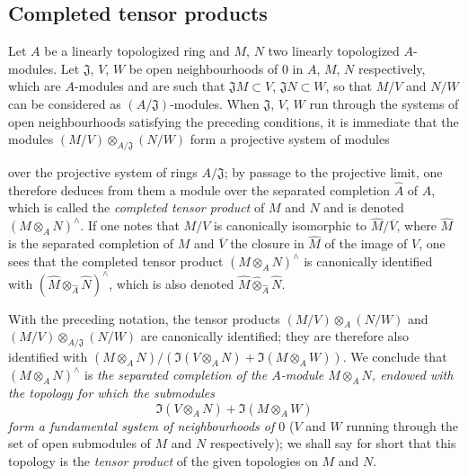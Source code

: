 \subsection{Completed tensor products}
\label{subsection:0.7.7}

\begin{env}[7.7.1]
\label{0.7.7.1}
Let $A$ be a linearly topologized ring and $M$, $N$ two linearly
topologized $A$-modules. Let $\mathfrak J$, $V$, $W$ be open neighbourhoods
of $0$ in $A$, $M$, $N$ respectively, which are
$A$-modules and are such that $\mathfrak JM\subset V$, $\mathfrak JN\subset W$,
so that $M/V$ and $N/W$ can be considered as
$(A/\mathfrak J)$-modules. When $\mathfrak J$, $V$, $W$ run through the
systems of open neighbourhoods satisfying the preceding conditions, it is
immediate that the modules
$(M/V)\otimes_{A/\mathfrak J}(N/W)$ form a projective system of modules


over the projective system of rings $A/\mathfrak J$; by passage to the projective
limit, one therefore deduces from them a module over the separated completion $\widehat A$
of $A$, which is called the \emph{completed tensor product} of $M$ and
$N$ and is denoted $(M\otimes_A N)^\wedge$. If one notes that $M/V$
is canonically isomorphic to $\widehat M/\overline V$, where $\widehat M$ is
the separated completion of $M$ and $\overline V$ the closure in $\widehat M$ of
the image of $V$, one sees that the completed tensor product
$(M\otimes_A N)^\wedge$ is canonically identified with
$(\widehat M\otimes_{\widehat A}\widehat N)^\wedge$, which is also denoted
$\widehat M\widehat\otimes_{\widehat A}\widehat N$.
\end{env}

\begin{env}[7.7.2]
\label{0.7.7.2}
\begin{sloppypar}
With the preceding notation, the tensor products
$(M/V)\otimes_A(N/W)$ and
$(M/V)\otimes_{A/\mathfrak J}(N/W)$ are canonically identified; they
are therefore also identified with
$(M\otimes_A N)/(\Im(V\otimes_A N)+\Im(M\otimes_A W))$.
We conclude that $(M\otimes_A N)^\wedge$ is \emph{the separated completion of the
$A$-module $M\otimes_A N$, endowed with the topology for which the
submodules}
\[
  \Im(V\otimes_A N)+\Im(M\otimes_A W)
\]
\emph{form a fundamental system of neighbourhoods of $0$} ($V$ and $W$
running through the set of open submodules of $M$ and $N$
respectively); we shall say for short that this topology is the
\emph{tensor product} of the given topologies on $M$ and $N$.
\end{sloppypar}
\end{env}

